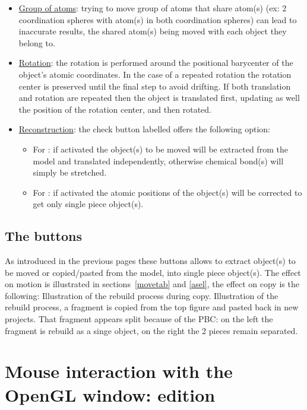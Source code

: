 \begin{itemize} 
\item \uline{Group of atoms}: trying to move group of atoms that share atom(s) (ex: 2 coordination spheres with atom(s) in both coordination spheres) can lead to inaccurate results, 
the shared atom(s) being moved with each object they belong to.
\item \uline{Rotation}: the rotation is performed around the positional barycenter of the object's atomic coordinates. 
In the case of a repeated rotation the rotation center is preserved until the final step to avoid drifting. 
If both translation and rotation are repeated then the object is translated first, updating as well the position of the rotation center, and then rotated.
\item \uline{Reconstruction}: the check button labelled  offers 
the following option:
\begin{itemize}
\item For : if activated the object(s) to be moved will be extracted from the model and translated independently, otherwise chemical bond(s) will simply be stretched. 
\item For : if activated the atomic positions of the object(s) will be corrected to get only single piece object(s). 
\end{itemize}
\end{itemize}

\clearpage

\subsection{The  buttons}
As introduced in the previous pages these buttons allows to extract object(s) to be moved or copied/pasted from the model, into single piece object(s). 
The effect on motion is illustrated in sections~\ref{movetab} and \ref{asel}, the effect on copy is the following:
{Illustration of the rebuild process during copy.}
{Illustration of the rebuild process, a fragment is copied from the top figure 
and pasted back in new projects. That fragment appears split because of the PBC: on the left the fragment is rebuild as a singe object, on the right the 2 pieces remain separated.}

\clearpage

\section{Mouse interaction with the OpenGL window: edition}
\label{mouseedit}

